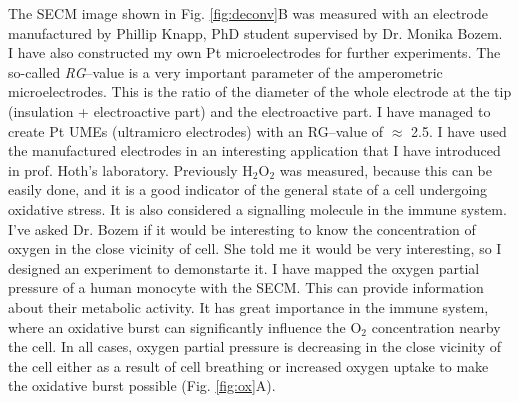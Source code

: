 \documentclass[a4paper, 11pt, oneside, bibliography=totoc]{article}
\begin{document}
The SECM image shown in Fig. \ref{fig:deconv}B was measured with an electrode manufactured by Phillip Knapp, PhD student supervised by Dr. Monika Bozem. I have also constructed my own Pt microelectrodes for further experiments. The so-called \emph{RG}--value is a very important parameter of the amperometric microelectrodes. This is the ratio of the diameter of the whole electrode at the tip (insulation + electroactive part) and the electroactive part. I have managed to create Pt UMEs (ultramicro electrodes) with an RG--value of $\approx$ 2.5. I have used the manufactured electrodes in an interesting application that I have introduced in prof. Hoth's laboratory. Previously H$_2$O$_2$ was measured, because this can be easily done, and it is a good indicator of the general state of a cell undergoing oxidative stress. It is also considered a signalling molecule in the immune system. I've asked Dr. Bozem if it would be interesting to know the concentration of oxygen in the close vicinity of cell. She told me it would be very interesting, so I designed an experiment to demonstarte it. I have mapped the oxygen partial pressure of a human monocyte with the SECM. This can provide information about their metabolic activity. It has great importance in the immune system, where an oxidative burst can significantly influence the O$_2$ concentration nearby the cell. In all cases, oxygen partial pressure is decreasing in the close vicinity of the cell either as a result of cell breathing or increased oxygen uptake to make the oxidative burst possible (Fig. \ref{fig:ox}A).
\end{document}
